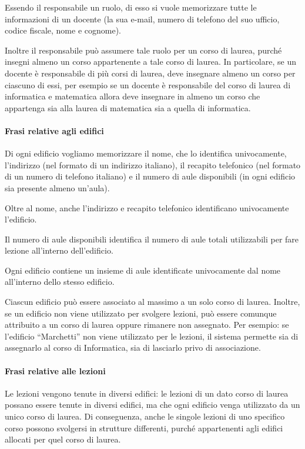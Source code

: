 \documentclass[a4paper,11pt]{article}
\begin{document}
Essendo il responsabile un ruolo, di esso si vuole memorizzare tutte le informazioni di un docente (la sua e-mail, numero di telefono del suo ufficio, codice fiscale, nome e cognome).

Inoltre il responsabile può assumere tale ruolo per un corso di laurea, purché insegni almeno un corso appartenente a tale corso di laurea. In particolare, se un docente è responsabile di più corsi di laurea, deve insegnare almeno un corso per ciascuno di essi, per esempio se un docente è responsabile del corso di laurea di informatica e matematica allora deve insegnare in almeno un corso che appartenga sia alla laurea di matematica sia a quella di informatica.


\paragraph{Frasi relative agli edifici}

Di ogni edificio vogliamo memorizzare il nome, che lo identifica univocamente, l'indirizzo (nel formato di un indirizzo italiano), il recapito telefonico (nel formato di un numero di telefono italiano) e il numero di aule disponibili (in ogni edificio sia presente almeno un'aula).

Oltre al nome, anche l'indirizzo e recapito telefonico identificano univocamente l'edificio.

Il numero di aule disponibili identifica il numero di aule totali utilizzabili per fare lezione all'interno dell'edificio.

Ogni edificio contiene un insieme di aule identificate univocamente dal nome all'interno dello stesso edificio.

Ciascun edificio può essere associato al massimo a un solo corso di laurea. Inoltre, se un edificio non viene utilizzato per svolgere lezioni, può essere comunque attribuito a un corso di laurea oppure rimanere non assegnato. Per esempio: se l'edificio ``Marchetti'' non viene utilizzato per le lezioni, il sistema permette sia di assegnarlo al corso di Informatica, sia di lasciarlo privo di associazione.



\paragraph{Frasi relative alle lezioni}

Le lezioni vengono tenute in diversi edifici: le lezioni di un dato corso di laurea possano essere tenute in diversi edifici, ma che ogni edificio venga utilizzato da un unico corso di laurea. Di conseguenza, anche le singole lezioni di uno specifico corso possono svolgersi in strutture differenti, purché appartenenti agli edifici allocati per quel corso di laurea.
\end{document}
